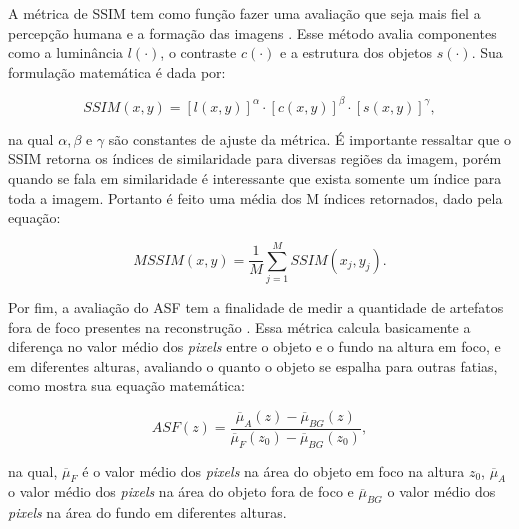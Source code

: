 A métrica de \acs{SSIM} tem como função fazer uma avaliação que seja mais fiel a percepção humana e a formação das imagens \cite[]{wang2004image}. Esse método avalia componentes como a  luminância $l(\cdot)$, o contraste $c(\cdot)$ e a estrutura dos objetos $s(\cdot)$. Sua formulação matemática é dada por:

\begin{equation}
SSIM(x,y) = [l(x,y)]^{\alpha} \cdot [c(x,y)]^{\beta} \cdot [s(x,y)]^{\gamma},
\label{eq:eqCap4SSIM}
\end{equation}

\noindent na qual $\alpha,\beta \text{ e } \gamma$ são constantes de ajuste da métrica. É importante ressaltar que o \acs{SSIM} retorna os índices de similaridade para diversas regiões da imagem, porém quando se fala em similaridade é interessante que exista somente um índice para toda a imagem. Portanto é feito uma média dos M índices retornados, dado pela equação:

\begin{equation}
MSSIM(x,y) = \dfrac{1}{M} \sum_{j=1}^{M} SSIM(x_{j},y_{j}).
\label{eq:eqCap4MSSIM}
\end{equation} 

Por fim, a avaliação do \acs{ASF} tem a finalidade de medir a quantidade de artefatos fora de foco presentes na reconstrução \cite{zhang2006comparative,borges2017metal}. Essa métrica calcula basicamente a diferença no valor médio dos \textit{pixels} entre o objeto e o fundo na altura em foco, e em diferentes alturas, avaliando o quanto o objeto se espalha para outras fatias, como mostra sua equação matemática:

\begin{equation}
ASF(z) = \dfrac{\overbar{\mu}_{A}(z) - \overbar{\mu}_{BG}(z)}{\overbar{\mu}_{F}(z_{0}) - \overbar{\mu}_{BG}(z_{0})},
\label{eq:eqCap4ASF}
\end{equation} 

\noindent na qual, $\overbar{\mu}_{F}$ é o valor médio dos \textit{pixels} na área do objeto em foco na altura $z_{0}$, $\overbar{\mu}_{A}$ o valor médio dos \textit{pixels} na área do objeto fora de foco e $\overbar{\mu}_{BG}$ o valor médio dos \textit{pixels} na área do fundo em diferentes alturas.

